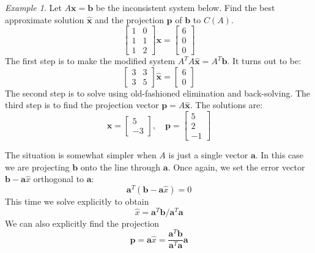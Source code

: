 \documentclass[11pt,oneside]{amsbook}
\theoremstyle{definition}
\theoremstyle{plain}
\theoremstyle{definition}
\theoremstyle{remark}
\newtheorem{example}[theorem]{Example}
\numberwithin{equation}{section}
\numberwithin{figure}{section}
\begin{document}
\begin{example}
  Let $A\bm{x}=\bm{b}$ be the inconsistent system below. Find the best approximate solution $\hat{\bm{x}}$ and the projection $\bm{p}$ of $\bm{b}$ to $C(A)$.
  \[\begin{bmatrix}1&0\\1&1\\1&2\end{bmatrix}\bm{x}
    =\begin{bmatrix}6\\0\\0\end{bmatrix}
  \]
  The first step is to make the modified system $A^TA\hat{\bm{x}}=A^T\bm{b}$. It turns out to be:
  \[\begin{bmatrix}3&3\\3&5\end{bmatrix}\hat{\bm{x}}
  =\begin{bmatrix}6\\0\end{bmatrix}
  \]
  The second step is to solve using old-fashioned elimination and back-solving. The third step is to find the projection vector $\bm{p}=A\hat{\bm{x}}$. The solutions are:
  \[\hat{\bm{x}}=\begin{bmatrix}5\\-3\end{bmatrix},\quad 
  \bm{p}=\begin{bmatrix}5\\2\\-1\end{bmatrix}
  \]
\end{example}

The situation is somewhat simpler when $A$ is just a single vector $\bm{a}$. In this case we are projecting $\bm{b}$ onto the line through $\bm{a}$. Once again, we set the error vector $\bm{b}-\bm{a}\hat x$ orthogonal to $\bm{a}$:
\[\bm{a}^T(\bm{b}-\bm{a}\hat{x})=0
\]
This time we solve explicitly to obtain
\[\hat x=\bm{a}^T\bm{b}/\bm{a}^T\bm{a}
\]
We can also explicitly find the projection
\[\bm{p}=\bm{a}\hat{x}
  =\frac{\bm{a}^T\bm{b}}{\bm{a}^T\bm{a}}\bm{a}
\]
\end{document}
